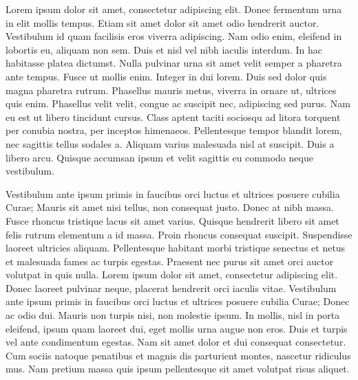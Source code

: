 Lorem ipsum dolor sit amet, consectetur adipiscing elit. Donec fermentum 
urna in elit mollis tempus. Etiam sit amet dolor sit amet odio hendrerit 
auctor. Vestibulum id quam facilisis eros viverra adipiscing. Nam odio 
enim, eleifend in lobortis eu, aliquam non sem. Duis et nisl vel nibh 
iaculis interdum. In hac habitasse platea dictumst. Nulla pulvinar urna 
sit amet velit semper a pharetra ante tempus. Fusce ut mollis enim. Integer 
in dui lorem. Duis sed dolor quis magna pharetra rutrum. Phasellus mauris 
metus, viverra in ornare ut, ultrices quis enim. Phasellus velit velit, 
congue ac suscipit nec, adipiscing sed purus. Nam eu est ut libero tincidunt 
cursus. Class aptent taciti sociosqu ad litora torquent per conubia nostra, 
per inceptos himenaeos. Pellentesque tempor blandit lorem, nec sagittis 
tellus sodales a. Aliquam varius malesuada nisl at suscipit. Duis a libero 
arcu. Quisque accumsan ipsum et velit sagittis eu commodo neque vestibulum.

Vestibulum ante ipsum primis in faucibus orci luctus et ultrices posuere 
cubilia Curae; Mauris sit amet nisi tellus, non consequat justo. Donec at 
nibh massa. Fusce rhoncus tristique lacus sit amet varius. Quisque hendrerit 
libero sit amet felis rutrum elementum a id massa. Proin rhoncus consequat 
suscipit. Suspendisse laoreet ultricies aliquam. Pellentesque habitant morbi 
tristique senectus et netus et malesuada fames ac turpis egestas. Praesent 
nec purus sit amet orci auctor volutpat in quis nulla. Lorem ipsum dolor sit 
amet, consectetur adipiscing elit. Donec laoreet pulvinar neque, placerat 
hendrerit orci iaculis vitae. Vestibulum ante ipsum primis in faucibus orci 
luctus et ultrices posuere cubilia Curae; Donec ac odio dui. Mauris non turpis 
nisi, non molestie ipsum. In mollis, nisl in porta eleifend, ipsum quam 
laoreet dui, eget mollis urna augue non eros. Duis et turpis vel ante 
condimentum egestas. Nam sit amet dolor et dui consequat consectetur. Cum 
sociis natoque penatibus et magnis dis parturient montes, nascetur ridiculus 
mus. Nam pretium massa quis ipsum pellentesque sit amet volutpat risus aliquet.

